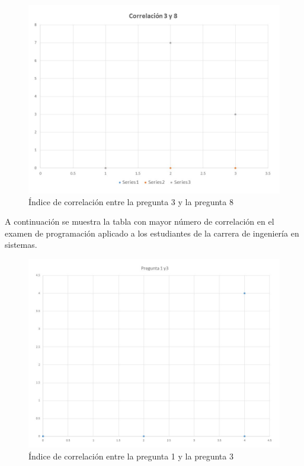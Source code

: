 \documentclass[12pt] {report}
\begin{document}
\begin{figure}[H]
\centering 
\includegraphics[scale=.4]{correlaci_n_38.jpg}
\caption{Índice de correlación entre la pregunta 3 y la pregunta 8}
\end{figure}
A continuación se muestra la tabla con mayor número de correlación en el examen de programación aplicado a los estudiantes de la carrera de ingeniería en sistemas.\\

\begin{figure}[H]
\centering 
\includegraphics[scale=.4]{PCorrelacion1.jpg}
\caption{Índice de correlación entre la pregunta 1 y la pregunta 3}
\end{figure}
\end{document}
